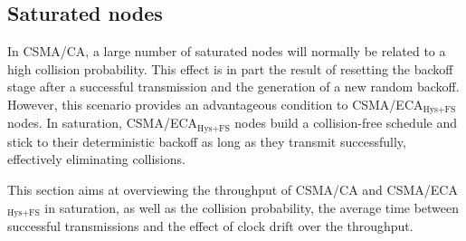 \documentclass[a4paper,journal]{IEEEtran}
\providecommand{\DIFaddbegin}{} %
\providecommand{\DIFaddend}{} %
\begin{document}
	\DIFaddbegin 


	\DIFaddend \subsection{Saturated nodes}\label{resultsSaturated}
	In CSMA/CA, a large number of saturated nodes will normally be related to a high collision probability. This effect is in part the result of resetting the backoff stage after a successful transmission and the generation of a new random backoff. However, this scenario provides an advantageous condition to CSMA/ECA$_{\text{Hys+FS}}$ nodes. In saturation, CSMA/ECA$_{\text{Hys+FS}}$ nodes build a collision-free schedule and stick to their deterministic backoff as long as they transmit successfully, effectively eliminating collisions.

	This section aims at overviewing the throughput of CSMA/CA and CSMA/ECA$_{\text{Hys+FS}}$ in saturation, as well as the collision probability, the average time between successful transmissions and the effect of clock drift over the throughput.
	\\
\end{document}
